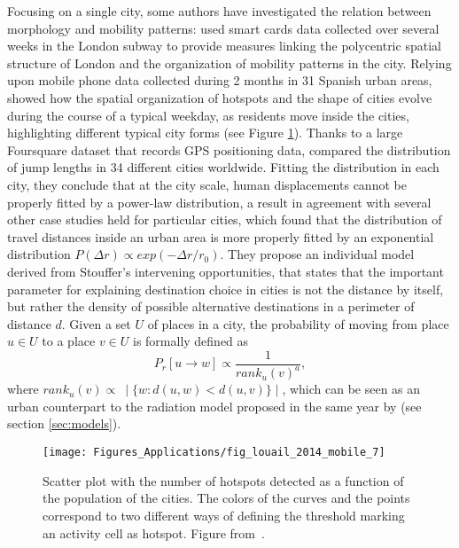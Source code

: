 Focusing on
a single city, some authors have investigated the relation between
morphology and mobility patterns: \cite{roth_2011_structure} used smart cards
data collected over several weeks in the London subway to provide
measures linking the polycentric spatial structure of London and the
organization of mobility patterns in the city. Relying upon mobile phone data collected during 2 months in
31 Spanish urban areas, \cite{louail_2014_mobile} showed how the spatial
organization of hotspots and the shape of cities evolve during the
course of a typical weekday, as residents move inside the cities,
highlighting different typical city forms (see Figure \ref{fig:louail_2014_mobile_7}). Thanks to a large
Foursquare dataset that records GPS positioning data,
\cite{noulas_2012_tale} compared the distribution of 
jump lengths in 34 different cities worldwide. Fitting the
distribution in each city, they conclude that at the city scale, human
displacements cannot be properly fitted by a power-law distribution, a
result in agreement with several other case studies held for
particular cities, which found that the distribution of travel
distances inside an urban area is more properly fitted by an
exponential distribution $P(\Delta r) \propto exp(-\Delta
r/r_0)$. They propose an individual model derived from Stouffer's
intervening opportunities, that states that the important parameter
for explaining destination choice in cities is not the distance by
itself, but rather the density of possible alternative destinations in
a perimeter of distance $d$. Given a set $U$ of places in a city, the
probability of moving from place $u \in U$ to a place $v \in U$ is
formally defined as
\begin{equation}
P_r[u\rightarrow w] \propto \frac{1}{rank_u(v)^a},
\end{equation}
where $rank_u(v) \propto~\mid\{w:d(u,w)<d(u,v)\}\mid $, which can be seen as an urban counterpart to the radiation model
proposed in the same year by \cite{simini_2012_universal} (see section
\ref{sec:models}).

\begin{figure}[t!]
\centering
\texttt{[image: Figures\_Applications/fig\_louail\_2014\_mobile\_7]}
\caption{Scatter plot with the number of hotspots detected as a function of the population of the cities. The colors of the curves and the points correspond to two different ways of defining the threshold marking an activity cell as hotspot. Figure from~\cite{louail_2014_mobile}. }
\label{fig:louail_2014_mobile_7}
\end{figure}

